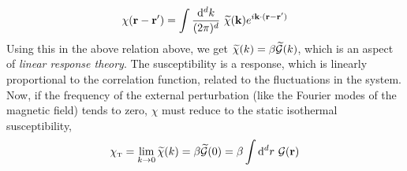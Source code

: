 \begin{align*}
    \chi(\vb{r}-\vb{r}') = \int \frac{\dd^d k}{(2\pi)^d} \ \widetilde{\chi}(\vb{k}) e^{i \vb{k}\cdot (\vb{r}-\vb{r}')}
\end{align*}
Using this in the above relation above, we get $\widetilde{\chi}(k) = \beta \widetilde{\mathcal G}(k)$, which is an aspect of \textit{linear response theory}. The susceptibility is a response, which is linearly proportional to the correlation function, related to the fluctuations in the system. Now, if the frequency of the external perturbation (like the Fourier modes of the magnetic field) tends to zero, $\chi$ must reduce to the static isothermal susceptibility, 
\begin{equation}\label{chixi}
    \chi_{\text{\tiny T}} = \lim\limits_{k\to 0 }\widetilde{\chi}(k) = \beta \widetilde{\mathcal G}(0) = \beta \int \dd^d r \ \mathcal G(\vb{r})
\end{equation}
